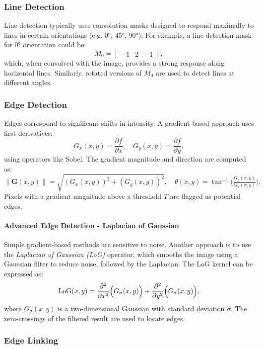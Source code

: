 \documentclass[a4paper,12pt]{article}
\begin{document}
\subsubsection{Line Detection}

Line detection typically uses convolution masks designed to respond maximally to lines in certain orientations (e.g. 0°, 45°, 90°). For example, a line-detection mask for 0° orientation could be:
\[
M_0 = 
\begin{bmatrix}
-1 & 2 & -1
\end{bmatrix},
\]
which, when convolved with the image, provides a strong response along horizontal lines. Similarly, rotated versions of \(M_0\) are used to detect lines at different angles.

\subsubsection{Edge Detection}

Edges correspond to significant shifts in intensity. A gradient-based approach uses first derivatives:
\[
G_x(x,y) = \frac{\partial f}{\partial x}, \quad
G_y(x,y) = \frac{\partial f}{\partial y},
\]
using operators like Sobel. The gradient magnitude and direction are computed as:
\[
\lVert \mathbf{G}(x,y) \rVert 
= \sqrt{(G_x(x,y))^2 + (G_y(x,y))^2},
\quad
\theta(x,y) 
= \tan^{-1}\!\bigl(\tfrac{G_y(x,y)}{G_x(x,y)}\bigr).
\]
Pixels with a gradient magnitude above a threshold \(T\) are flagged as potential edges.

\paragraph{Advanced Edge Detection - Laplacian of Gaussian}

Simple gradient-based methods are sensitive to noise. Another approach is to use the \emph{Laplacian of Gaussian (LoG)} operator, which smooths the image using a Gaussian filter to reduce noise, followed by the Laplacian. The LoG kernel can be expressed as:
\begin{equation}
    \text{LoG}(x, y) = \frac{\partial^2}{\partial x^2}\Bigl(G_\sigma(x, y)\Bigr) + \frac{\partial^2}{\partial y^2}\Bigl(G_\sigma(x, y)\Bigr),
\end{equation}
where \(G_\sigma(x, y)\) is a two-dimensional Gaussian with standard deviation \(\sigma\). The zero-crossings of the filtered result are used to locate edges.

\subsubsection{Edge Linking}
\end{document}

